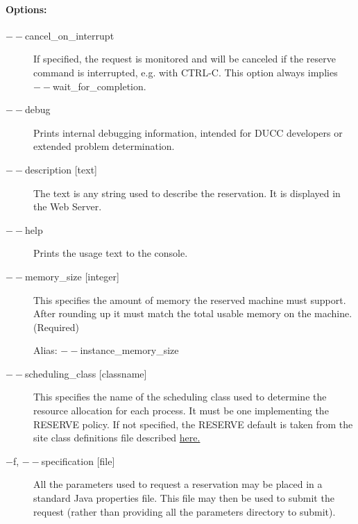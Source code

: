     \paragraph{Options:}
    
        \begin{description}

            \item[$--$cancel\_on\_interrupt] If specified, the request is monitored 
              and will be canceled if the reserve command is interrupted, e.g. with CTRL-C. 
              This option always implies $--$wait\_for\_completion.

            \item[$--$debug ]          
              Prints internal debugging information, intended for DUCC developers or extended problem determination.
              
            \item[$--$description {[text]}]               
              The text is any string used to describe the reservation. It is displayed in the Web Server. 
              
            \item[$--$help ]             
              Prints the usage text to the console. 
                            
            \item[$--$memory\_size {[integer]}]               
              This specifies the amount of memory the reserved machine must support. After rounding
              up it must match the total usable memory on the machine. (Required)

              Alias: $--$instance\_memory\_size

            \item[$--$scheduling\_class {[classname]}]               
              This specifies the name of the scheduling class used to determine the resource 
              allocation for each process. It must be one implementing the RESERVE policy.
              If not specified, the RESERVE default is taken from the site class definitions file
              described \hyperref[subsubsec:class.configuration]{here.} 
              
            \item[$-$f, $--$specification {[file]}]               
              All the parameters used to request a reservation may be placed in a standard Java 
              properties file. This file may then be used to submit the request (rather than providing all 
              the parameters directory to submit). 


\end{description}
